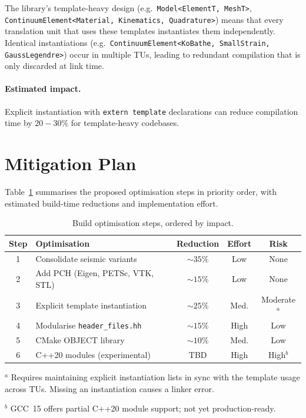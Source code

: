 The library's template-heavy design (e.g.\
\texttt{Model<ElementT, MeshT>},
\texttt{ContinuumElement<Material, Kinematics, Quadrature>})
means that every translation unit that uses these templates
instantiates them independently.  Identical instantiations (e.g.\
\texttt{ContinuumElement<KoBathe, SmallStrain, GaussLegendre>})
occur in multiple TUs, leading to redundant compilation that is
only discarded at link time.

\paragraph{Estimated impact.}
Explicit instantiation with \texttt{extern template} declarations
can reduce compilation time by $20{-}30\%$ for template-heavy
codebases.


\section{Mitigation Plan}
\label{sec:build-mitigation}

Table~\ref{tab:build-mitigation} summarises the proposed
optimisation steps in priority order, with estimated build-time
reductions and implementation effort.

\begin{table}[htbp]
  \centering
  \caption{Build optimisation steps, ordered by impact.}
  \label{tab:build-mitigation}
  \small
  \begin{tabular}{@{}clccc@{}}
    \toprule
    \textbf{Step} &
    \textbf{Optimisation} &
    \textbf{Reduction} &
    \textbf{Effort} &
    \textbf{Risk} \\
    \midrule
    1 & Consolidate seismic variants &
        ${\sim}35\%$ & Low  & None \\
    2 & Add PCH (Eigen, PETSc, VTK, STL) &
        ${\sim}15\%$ & Low  & None \\
    3 & Explicit template instantiation &
        ${\sim}25\%$ & Med. & Moderate$^{a}$ \\
    4 & Modularise \texttt{header\_files.hh} &
        ${\sim}15\%$ & High & Low \\
    5 & CMake OBJECT library &
        ${\sim}10\%$ & Med. & Low \\
    6 & C++20 modules (experimental) &
        TBD   & High & High$^{b}$ \\
    \bottomrule
  \end{tabular}
  
  \medskip
  \footnotesize
  $^{a}$ Requires maintaining explicit instantiation lists in sync
  with the template usage across TUs.  Missing an instantiation causes
  a linker error.

  $^{b}$ GCC~15 offers partial C++20 module support; not yet production-ready.
\end{table}

